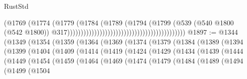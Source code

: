 \begin{lexlean}{RustStd}
\begin{coremodule}
{\begin{coremodule}
{{{{{{{{{{{{{{{{{{{{{{{{{{                                                                            (@1769
                                                                              (@1774
                                                                                (@1779
                                                                                  (@1784
                                                                                    (@1789
                                                                                      (@1794
                                                                                        (@1799
                                                                                          (@539
                                                                                            (@540
                                                                                              @1800
                                                                                              (@542
                                                                                                @1800))
                                                                                            @317))))))))))))))))))))))))))))))))))))))))))))
@1897 := @1344
    (@1349
      (@1354
        (@1359
          (@1364
            (@1369
              (@1374
                (@1379
                  (@1384
                    (@1389
                      (@1394
                        (@1399
                          (@1404
                            (@1409
                              (@1414
                                (@1419
                                  (@1424
                                    (@1429
                                      (@1434
                                        (@1439
                                          (@1444
                                            (@1449
                                              (@1454
                                                (@1459
                                                  (@1464
                                                    (@1469
                                                      (@1474
                                                        (@1479
                                                          (@1484
                                                            (@1489
                                                              (@1494
                                                                (@1499
                                                                  (@1504
}}}}}}}}}}}}}}}}}}}}}}}}}}
\end{coremodule}}
\end{coremodule}
\end{lexlean}
